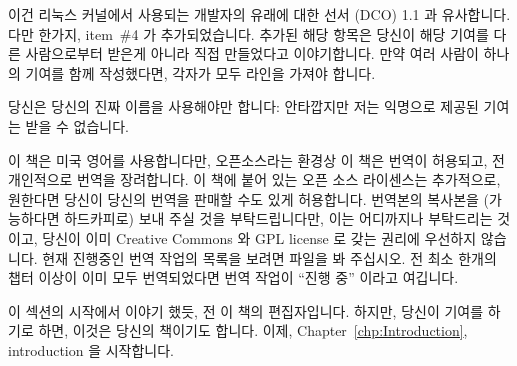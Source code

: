 이건 리눅스 커널에서 사용되는 개발자의 유래에 대한 선서 (DCO) 1.1 과
유사합니다.
다만 한가지, item~\#4 가 추가되었습니다.
추가된 해당 항목은 당신이 해당 기여를 다른 사람으로부터 받은게 아니라 직접
만들었다고 이야기합니다.
만약 여러 사람이 하나의 기여를 함께 작성했다면, 각자가 모두 
라인을 가져야 합니다.

\iffalse
This is similar to the Developer's Certificate of Origin (DCO) 1.1 used
by the Linux kernel.
The only addition is item~\#4.
This added item says that you wrote the contribution yourself, as opposed
to having (say) copied it from somewhere.
If multiple people authored a contribution, each should have a
\co{Signed-off-by:} line.
\fi

당신은 당신의 진짜 이름을 사용해야만 합니다: 안타깝지만 저는 익명으로 제공된
기여는 받을 수 없습니다.

\iffalse
You must use your real name:  I unfortunately cannot accept pseudonymous or
anonymous contributions.
\fi

이 책은 미국 영어를 사용합니다만, 오픈소스라는 환경상 이 책은 번역이 허용되고,
전 개인적으로 번역을 장려합니다.  이 책에 붙어 있는 오픈 소스 라이센스는
추가적으로, 원한다면 당신이 당신의 번역을 판매할 수도 있게 허용합니다.
번역본의 복사본을 (가능하다면 하드카피로) 보내 주실 것을 부탁드립니다만, 이는
어디까지나 부탁드리는 것이고, 당신이 이미 Creative Commons 와 GPL license 로
갖는 권리에 우선하지 않습니다.  현재 진행중인 번역 작업의 목록을 보려면
 파일을 봐 주십시오.  전 최소 한개의 챕터 이상이 이미 모두
번역되었다면 번역 작업이 ``진행 중'' 이라고 여깁니다.

\iffalse
The language of this book is American English, however, the open-source
nature of this book permits translations, and I personally encourage them.
The open-source licenses covering this book additionally allow you
to sell your translation, if you wish.
I do request that you send me a copy of the translation (hardcopy if
available), but this is a request made as a professional courtesy,
and is not in any way a prerequisite to the permission that you already
have under the Creative Commons and GPL licenses.
Please see the \co{FAQ.txt} file in the source tree for a list of
translations currently in progress.
I consider a translation effort to be ``in progress'' once at least one
chapter has been fully translated.
\fi

이 섹션의 시작에서 이야기 했듯, 전 이 책의 편집자입니다.
하지만, 당신이 기여를 하기로 하면, 이것은 당신의 책이기도 합니다.
이제, Chapter~\ref{chp:Introduction}, introduction 을 시작합니다.

\iffalse
As noted at the beginning of this section, I am this book's editor.
However, if you choose to contribute, it will be your book as well.
With that, I offer you Chapter~\ref{chp:Introduction}, our introduction.
\fi
